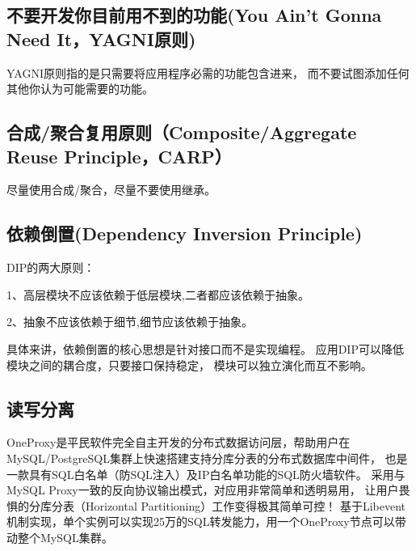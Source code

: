 \documentclass{book}
\begin{document}

\subsection{不要开发你目前用不到的功能(You Ain’t Gonna Need It，YAGNI原则)}

YAGNI原则指的是只需要将应用程序必需的功能包含进来，
而不要试图添加任何其他你认为可能需要的功能。


\subsection{合成/聚合复用原则（Composite/Aggregate Reuse Principle，CARP）}

尽量使用合成/聚合，尽量不要使用继承。

\subsection{依赖倒置(Dependency Inversion Principle)}

DIP的两大原则：

1、高层模块不应该依赖于低层模块,二者都应该依赖于抽象。

2、抽象不应该依赖于细节,细节应该依赖于抽象。

具体来讲，依赖倒置的核心思想是针对接口而不是实现编程。
应用DIP可以降低模块之间的耦合度，只要接口保持稳定，
模块可以独立演化而互不影响。

\subsection{读写分离}

OneProxy是平民软件完全自主开发的分布式数据访问层，帮助用户在MySQL/PostgreSQL集群上快速搭建支持分库分表的分布式数据库中间件，
也是一款具有SQL白名单（防SQL注入）及IP白名单功能的SQL防火墙软件。
采用与MySQL Proxy一致的反向协议输出模式，对应用非常简单和透明易用，
让用户畏惧的分库分表（Horizontal Partitioning）工作变得极其简单可控！
基于Libevent机制实现，单个实例可以实现25万的SQL转发能力，用一个OneProxy节点可以带动整个MySQL集群。
\end{document}
